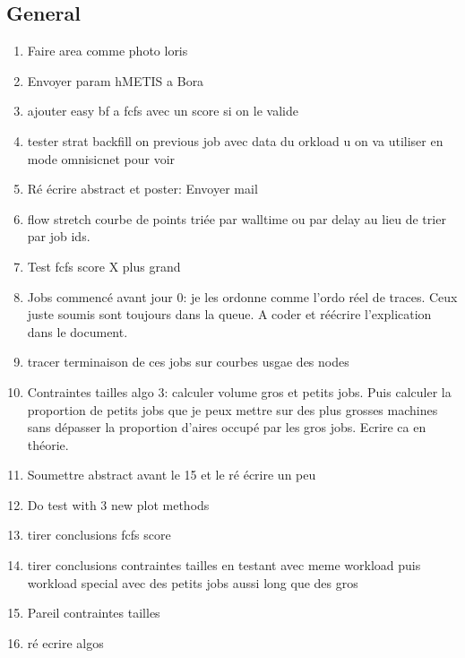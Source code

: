 \documentclass[a4paper]{article}
\begin{document}
	\subsection{General}
		\begin{enumerate}
			\item Faire area comme photo loris
			\item Envoyer param hMETIS a Bora
			
			\item ajouter easy bf a fcfs avec un score si on le valide
			
			\item tester strat backfill on previous job avec data du orkload u on va utiliser en mode omnisicnet pour voir
			
			\item Ré écrire abstract et poster: Envoyer mail
		
			\item flow stretch courbe de points triée par walltime ou par delay au lieu de trier par job ids.
			
			\item Test fcfs score X plus grand
			
			\item Jobs commencé avant jour 0: je les ordonne comme l'ordo réel de traces. Ceux juste soumis sont toujours dans la queue. A coder et réécrire l'explication dans le document.
			\item tracer terminaison de ces jobs sur courbes usgae des nodes
			
			\item Contraintes tailles algo 3: calculer volume gros et petits jobs. Puis calculer la proportion de petits jobs que je peux mettre sur des plus grosses machines sans dépasser la proportion d'aires occupé par les gros jobs. Ecrire ca en théorie.
			
			\item Soumettre abstract avant le 15 et le ré écrire un peu
		
			\item Do test with 3 new plot methods
			\item tirer conclusions fcfs score
			\item tirer conclusions contraintes tailles en testant avec meme workload puis workload special avec des petits jobs aussi long que des gros
			\item Pareil contraintes tailles
			
			\item ré ecrire algos
			

\end{enumerate}
\end{document}
